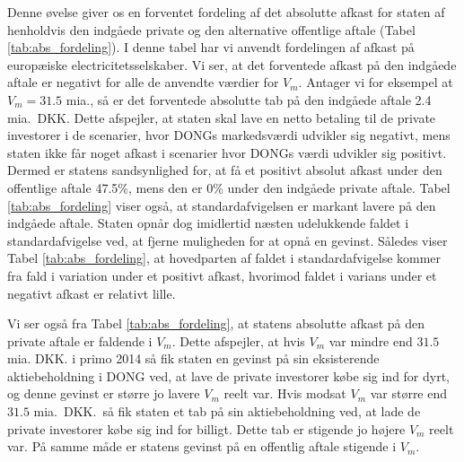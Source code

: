 \documentclass{article}
\begin{document}
Denne øvelse giver os en forventet fordeling af det absolutte afkast for staten af henholdvis den indgåede private og den alternative offentlige aftale (Tabel \ref{tab:abs_fordeling}). I denne tabel har vi anvendt fordelingen af afkast på europæiske electricitetsselskaber. Vi ser, at det forventede afkast på den indgåede aftale er negativt for alle de anvendte værdier for $V_m$. Antager vi for eksempel at $V_m=31.5$ mia., så er det forventede absolutte tab på den indgåede aftale 2.4 mia.\ DKK. Dette afspejler, at staten skal lave en netto betaling til de private investorer i de scenarier, hvor DONGs markedsværdi udvikler sig negativt, mens staten ikke får noget afkast i scenarier hvor DONGs værdi udvikler sig positivt. Dermed er statens sandsynlighed for, at få et positivt absolut afkast under den offentlige aftale 47.5\%, mens den er 0\% under den indgåede private aftale. Tabel \ref{tab:abs_fordeling} viser også, at standardafvigelsen er markant lavere på den indgåede aftale. Staten opnår dog imidlertid næsten udelukkende faldet i standardafvigelse ved, at fjerne muligheden for at opnå en gevinst. Således viser Tabel \ref{tab:abs_fordeling}, at hovedparten af faldet i standardafvigelse kommer fra fald i variation under et positivt afkast, hvorimod faldet i varians under et negativt afkast er relativt lille.

Vi ser også fra Tabel \ref{tab:abs_fordeling}, at statens absolutte afkast på den private aftale er faldende i $V_m$. Dette afspejler, at hvis $V_m$ var mindre end $31.5$ mia. DKK. i primo 2014 så fik staten en gevinst på sin eksisterende aktiebeholdning i DONG ved, at lave de private investorer købe sig ind for dyrt, og denne gevinst er større jo lavere $V_m$ reelt var. Hvis modsat $V_m$ var større end $31.5$ mia.\ DKK.\, så fik staten et tab på sin aktiebeholdning ved, at lade de private investorer købe sig ind for billigt. Dette tab er stigende jo højere $V_m$ reelt var. På samme måde er statens gevinst på en offentlig aftale stigende i $V_m$.
\end{document}
